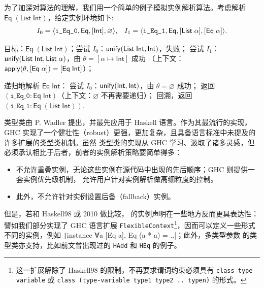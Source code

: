 为了加深对算法的理解，我们用一个简单的例子模拟实例解析算法。考虑解析 $\mathsf{Eq}\;(\mathsf{List}\;\mathsf{Int})$，给定实例环境如下:
{\setlength{\abovedisplayskip}{3pt}\setlength{\belowdisplayskip}{3pt}
  \begin{align*}
    I_0 = \langle \texttt{i\_Eq\_0}, \mathsf{Eq}, [\mathsf{Int}], \varnothing \rangle, &&
    I_1 = \langle \texttt{i\_Eq\_1}, \mathsf{Eq}, [\mathsf{List}\;\alpha], [\mathsf{Eq}\;\alpha] \rangle.
\end{align*}}

目标：$\mathsf{Eq}\;(\mathsf{List}\;\mathsf{Int})$；尝试 $I_0$：$\mathsf{unify}(\mathsf{List}\;\mathsf{Int}, \mathsf{Int})$，失败；
尝试 $I_1$：$\mathsf{unify}(\mathsf{List}\;\mathsf{Int}, \mathsf{List}\;\alpha)$，由 $\theta = [\alpha \mapsto \mathsf{Int}]$ 成功
（上下文：$\mathsf{apply}(\theta, [\mathsf{Eq}\;\alpha]) = [\mathsf{Eq}\;\mathsf{Int}]$）；

递归地解析 $\mathsf{Eq}\;\mathsf{Int}$：
尝试 $I_0$：$\mathsf{unify}(\mathsf{Int}, \mathsf{Int})$，由 $\theta = \varnothing$ 成功；
返回 $(\texttt{i\_Eq\_0} : \mathsf{Eq}\;\mathsf{Int})$（上下文：$\varnothing$ 不再需要递归）；
回溯，返回 $(\texttt{i\_Eq\_1} :  \mathsf{Eq}\;(\mathsf{List}\;\mathsf{Int}))$.

\begin{remark}
  类型类由 P. Wadler 提出，并最先应用于 Haskell 语言。作为其最流行的实现，
  GHC 实现了一个健壮性（robust）更强，更加复杂，且具备语言标准中未提及的许多扩展的类型类机制。虽然 \Tigris 类型类的实现从
  GHC 学习、汲取了诸多灵感，但必须承认相比于后者，前者的实例解析策略要简单得多：
\begin{itemize}\itemsep0em
    \item \Tigris 不允许重叠实例，无论这些实例在源代码中出现的先后顺序；GHC 则提供一套实例优先级机制，
      允许用户针对实例解析做高细粒度的控制。
    \item 此外，\Tigris 不允许针对实例设置后备（fallback）实例。
  \end{itemize}
  但是，若和 Haskell98 或 2010 做比较，
  \Tigris 的实例声明在一些地方反而更具表达性：譬如我们部分实现了 GHC 语言扩展 \texttt{FlexibleContext}\footnote{
    这一扩展解除了 Haskell98 的限制，不再要求谓词约束必须具有 \texttt{class type-variable} 或
    \texttt{class (type-variable type1 type2 .. typen)} 的形式。
  }，因而可以定义一些形式不同的实例，例如 \texttt|instance ∀a [Eq a], Eq (a * a) = ..|；此外，多类型参数
  的类型类亦支持，比如前文曾出现过的 \texttt{HAdd} 和 \texttt{HEq} 的例子。
\end{remark}

